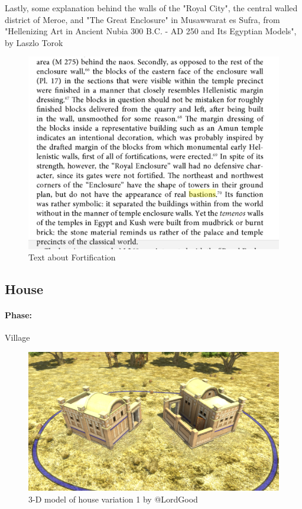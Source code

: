 \documentclass[a4paper,12pt]{scrreprt}
\begin{document}
Lastly, some explanation behind the walls of the "Royal City", the central walled district of Meroe, and "The Great Enclosure" in Musawwarat es Sufra, from "Hellenizing Art in Ancient Nubia 300 B.C. - AD 250 and Its Egyptian Models", by Laszlo Torok  

\begin{figure}[H]
	\centering
	\includegraphics[width=\textwidth]{img/fortress/text_fortification}
	\caption{Text about Fortification}
\end{figure}

\subsection{House}

\paragraph{Phase:} Village\\

\begin{figure}[H]
	\centering
	\includegraphics[width=\textwidth]{img/house/house_variation1}
	\caption{3-D model of house variation 1 by @LordGood}
\end{figure}
\end{document}
